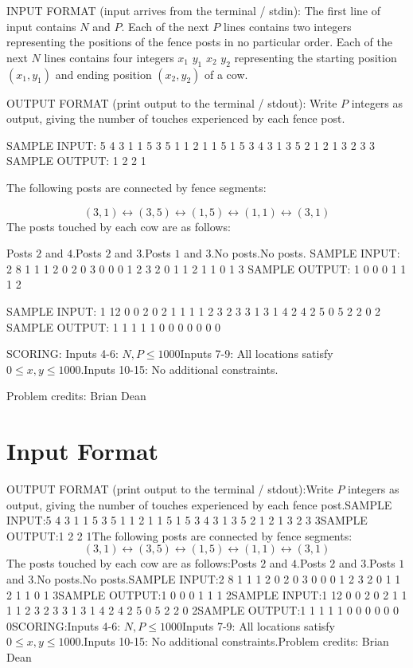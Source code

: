 \documentclass[12pt]{article}
\begin{document}
INPUT FORMAT (input arrives from the terminal / stdin):
The first line of input contains $N$ and $P$. Each of the next $P$ lines
contains two integers representing the positions of the fence posts in no
particular order. Each of the next $N$ lines contains four integers $x_1$ $y_1$
$x_2$ $y_2$ representing the starting position $(x_1, y_1)$ and ending position
$(x_2, y_2)$ of a cow.

OUTPUT FORMAT (print output to the terminal / stdout):
Write $P$ integers as output, giving the number of touches experienced by each
fence post.

SAMPLE INPUT:
5 4
3 1
1 5
3 5
1 1
2 1 1 5
1 5 3 4
3 1 3 5
2 1 2 1
3 2 3 3
SAMPLE OUTPUT: 
1
2
2
1

The following posts are connected by fence segments:

$$(3,1)\leftrightarrow (3, 5) \leftrightarrow  (1,5) \leftrightarrow (1,1) \leftrightarrow (3,1)$$
The posts touched by each cow are as follows:

Posts $2$ and $4$.Posts $2$ and $3$.Posts $1$ and $3$.No posts.No posts.
SAMPLE INPUT:
2 8
1 1
1 2
0 2
0 3
0 0
0 1
2 3
2 0
1 1 2 1
1 0 1 3
SAMPLE OUTPUT: 
1
0
0
0
1
1
1
2

SAMPLE INPUT:
1 12
0 0
2 0
2 1
1 1
1 2
3 2
3 3
1 3
1 4
2 4
2 5
0 5
2 2 0 2
SAMPLE OUTPUT: 
1
1
1
1
1
0
0
0
0
0
0
0

SCORING:
Inputs 4-6: $N,P\le 1000$Inputs 7-9: All locations satisfy $0\le x, y\le 1000$.Inputs 10-15: No additional constraints.


Problem credits: Brian Dean



\section*{Input Format}
OUTPUT FORMAT (print output to the terminal / stdout):Write $P$ integers as output, giving the number of touches experienced by each
fence post.SAMPLE INPUT:5 4
3 1
1 5
3 5
1 1
2 1 1 5
1 5 3 4
3 1 3 5
2 1 2 1
3 2 3 3SAMPLE OUTPUT:1
2
2
1The following posts are connected by fence segments:$$(3,1)\leftrightarrow (3, 5) \leftrightarrow  (1,5) \leftrightarrow (1,1) \leftrightarrow (3,1)$$The posts touched by each cow are as follows:Posts $2$ and $4$.Posts $2$ and $3$.Posts $1$ and $3$.No posts.No posts.SAMPLE INPUT:2 8
1 1
1 2
0 2
0 3
0 0
0 1
2 3
2 0
1 1 2 1
1 0 1 3SAMPLE OUTPUT:1
0
0
0
1
1
1
2SAMPLE INPUT:1 12
0 0
2 0
2 1
1 1
1 2
3 2
3 3
1 3
1 4
2 4
2 5
0 5
2 2 0 2SAMPLE OUTPUT:1
1
1
1
1
0
0
0
0
0
0
0SCORING:Inputs 4-6: $N,P\le 1000$Inputs 7-9: All locations satisfy $0\le x, y\le 1000$.Inputs 10-15: No additional constraints.Problem credits: Brian Dean
\end{document}
